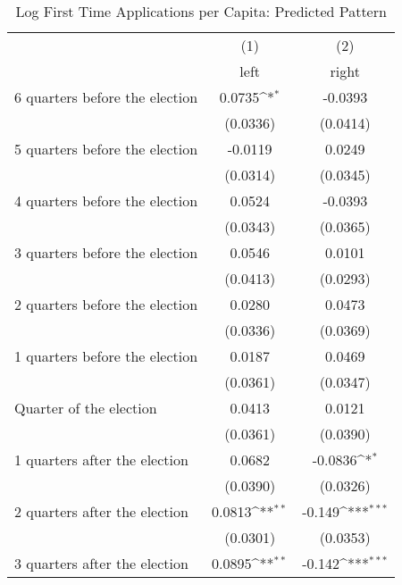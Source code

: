 \begin{table}[htbp]\centering
\def\sym#1{\ifmmode^{#1}\else\(^{#1}\)\fi}
\caption{Log First Time Applications per Capita: Predicted Pattern}
\begin{tabular}{l*{2}{c}}
\hline\hline
                    &\multicolumn{1}{c}{(1)}&\multicolumn{1}{c}{(2)}\\
                    &\multicolumn{1}{c}{left}&\multicolumn{1}{c}{right}\\
\hline
 6 quarters before the election&      0.0735\sym{*}  &     -0.0393         \\
                    &    (0.0336)         &    (0.0414)         \\
[1em]
 5 quarters before the election&     -0.0119         &      0.0249         \\
                    &    (0.0314)         &    (0.0345)         \\
[1em]
 4 quarters before the election&      0.0524         &     -0.0393         \\
                    &    (0.0343)         &    (0.0365)         \\
[1em]
 3 quarters before the election&      0.0546         &      0.0101         \\
                    &    (0.0413)         &    (0.0293)         \\
[1em]
 2 quarters before the election&      0.0280         &      0.0473         \\
                    &    (0.0336)         &    (0.0369)         \\
[1em]
 1 quarters before the election&      0.0187         &      0.0469         \\
                    &    (0.0361)         &    (0.0347)         \\
[1em]
Quarter of the election&      0.0413         &      0.0121         \\
                    &    (0.0361)         &    (0.0390)         \\
[1em]
 1 quarters after the election&      0.0682         &     -0.0836\sym{*}  \\
                    &    (0.0390)         &    (0.0326)         \\
[1em]
 2 quarters after the election&      0.0813\sym{**} &      -0.149\sym{***}\\
                    &    (0.0301)         &    (0.0353)         \\
[1em]
 3 quarters after the election&      0.0895\sym{**} &      -0.142\sym{***}\\

\end{tabular}
\end{table}
